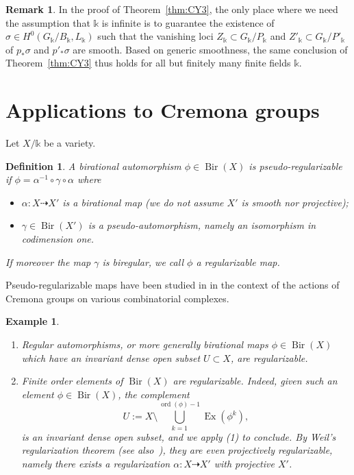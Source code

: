 \documentclass[a4paper,12pt]{amsart}
\def\k{\mathbb k}
\def\ord{{\operatorname{ord}}}
\def\Bir{{\operatorname{Bir}}}
\def\Ex{{\operatorname{Ex}}}
\theoremstyle{plain}
\newtheorem{example}[dummy]{Example}
\newtheorem{definition}[dummy]{Definition}
\numberwithin{equation}{section}
\theoremstyle{definition}
\newtheorem{remark}[dummy]{Remark}
\newcommand{\gs}{\sigma}
\renewcommand{\(}{\left(}
\renewcommand{\)}{\right)}
\newcommand{\dto}{\dashrightarrow}
\begin{document}
\begin{remark}
In the proof of Theorem~\ref{thm:CY3}, 
the only place where we need the assumption that
$\k$ is infinite is to guarantee 
the existence of $\gs \in H^0(G_\k/B_\k,L_\k)$
such that the vanishing loci $Z_\k \subset G_\k/P_\k$ and $Z'_\k \subset G_\k/P'_\k$
of $p_*\gs$ and $p'_*\gs$ 
are smooth. 
Based on generic smoothness,
the same conclusion of Theorem~\ref{thm:CY3} thus holds
for all but finitely many finite fields $\k$.
\end{remark}




\section{Applications to Cremona groups}
\label{sec:cremona}

Let $X/\k$ be a variety.

\begin{definition}\label{Def-reg}
A birational automorphism $\phi \in \Bir(X)$ is pseudo-regularizable
if $\phi = \alpha^{-1} \circ \gamma \circ \alpha$ where
\begin{itemize}
    \item $\alpha: X \dashrightarrow X'$ is a birational map
    (we do not assume $X'$ is smooth nor projective);
    \item $\gamma \in \Bir(X')$ is a pseudo-automorphism, namely
    an isomorphism in codimension one.
\end{itemize}

If moreover the map $\gamma$
is biregular, we call $\phi$ a regularizable map.
\end{definition}

Pseudo-regularizable maps have been
studied in \cite{Cantat-Cornulier, Lonjou-Urech}
in the context of the actions of Cremona
groups on various combinatorial complexes.

\begin{example} \label{ex-regbir} \hfill
\begin{enumerate}
    \item Regular automorphisms, or more generally
birational maps
$\phi \in \Bir(X)$ which have an invariant dense open subset
$U \subset X$, are regularizable.
\item Finite order elements of $\Bir(X)$ are regularizable.
Indeed, given such 
an element $\phi \in \Bir(X)$, the complement 
\[
U := X \setminus \bigcup_{k = 1}^{\ord(\phi)-1} \Ex(\phi^k),
\]
is an invariant dense open subset, and 
we apply (1) to conclude.
By Weil's regularization theorem (see also~\cite{Kraft}), 
they are even projectively regularizable,
namely there exists a regularization $\alpha : X \dto X'$
with projective $X'$.
\end{enumerate}
\end{example}
\end{document}
